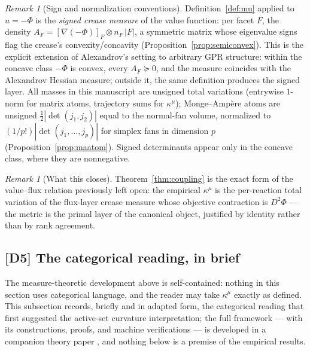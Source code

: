 \documentclass[11pt,a4paper]{article}
\theoremstyle{plain}
\theoremstyle{definition}
\theoremstyle{remark}
\newtheorem{remark}[theorem]{Remark}
\newcommand{\kmu}{\kappa^{\mu}}
\begin{document}
\begin{remark}[Sign and normalization conventions]\label{rem:conventions}
Definition~\ref{def:mu} applied to $u = -\Phi$ is the \emph{signed
crease measure} of the value function: per facet $F$, the density
$A_F = [\nabla(-\Phi)]_F \otimes n_F\,|F|$, a symmetric matrix whose
eigenvalue signs flag the crease's convexity/concavity
(Proposition~\ref{prop:semiconvex}). This is the explicit extension
of Alexandrov's setting to arbitrary GPR structure: within the
concave class $-\Phi$ is convex, every $A_F \succeq 0$, and the
measure coincides with the Alexandrov Hessian measure; outside it,
the same definition produces the signed layer. All masses in this
manuscript are unsigned total variations (entrywise $1$-norm for
matrix atoms, trajectory sums for $\kmu$); Monge--Amp\`ere atoms are
unsigned $\tfrac12|\det(j_1, j_2)|$ equal to the normal-fan volume,
normalized to $(1/p!)|\det(j_1,\dots,j_p)|$ for simplex fans in
dimension $p$ (Proposition~\ref{prop:maatom}). Signed determinants
appear only in the concave class, where they are nonnegative.
\end{remark}

\begin{remark}[What this closes]\label{rem:closes}
Theorem~\ref{thm:coupling} is the exact form of the value--flux
relation previously left open: the empirical $\kmu$ is the
per-reaction total variation of the flux-layer crease measure whose
objective contraction is $D^2\Phi$ --- the metric is the primal
layer of the canonical object, justified by identity rather than by
rank agreement.
\end{remark}

\subsection{[D5] The categorical reading, in brief}\label{sec:categorical}

The measure-theoretic development above is self-contained: nothing in
this section uses categorical language, and the reader may take
$\kmu$ exactly as defined. This subsection records, briefly and in
adapted form, the categorical reading that first suggested the
active-set curvature interpretation; the full framework --- with its
constructions, proofs, and machine verifications --- is developed in
a companion theory paper \citep{zai2026categorical}, and nothing
below is a premise of the empirical results.
\end{document}
